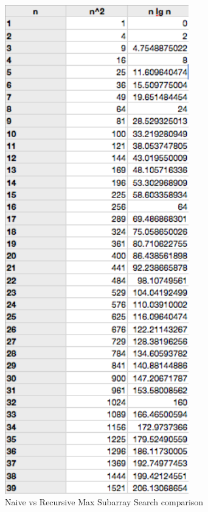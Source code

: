 \documentclass[11pt,letterpaper]{article}
\begin{document}
\begin{figure}[!h]

	\begin{center}
	\includegraphics[width=80mm]{images/ss}
	\end{center}

\caption{Naive vs Recursive Max Subarray Search comparison}
\label{find_arr_compare}
\end{figure}
\end{document}
